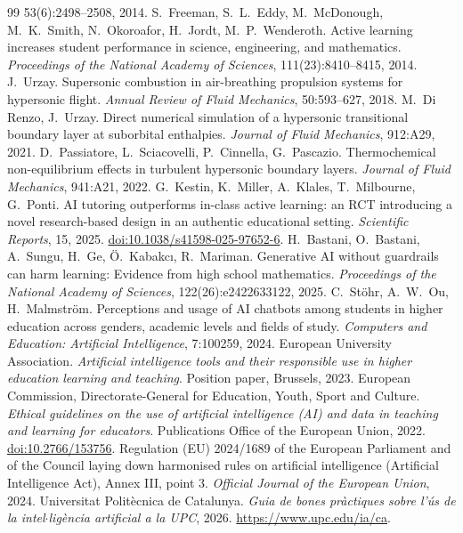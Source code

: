 \documentclass[11pt]{article}
\begin{document}
\begin{thebibliography}{99}
53(6):2498--2508, 2014.
 S.\ Freeman, S.\ L.\ Eddy, M.\ McDonough, M.\ K.\ Smith, N.\ Okoroafor,
H.\ Jordt, M.\ P.\ Wenderoth. Active learning increases student performance in science,
engineering, and mathematics. \emph{Proceedings of the National Academy of Sciences},
111(23):8410--8415, 2014.
 J.\ Urzay. Supersonic combustion in air-breathing propulsion systems for
hypersonic flight. \emph{Annual Review of Fluid Mechanics}, 50:593--627, 2018.
 M.\ Di Renzo, J.\ Urzay. Direct numerical simulation of a
hypersonic transitional boundary layer at suborbital enthalpies. \emph{Journal of Fluid
Mechanics}, 912:A29, 2021.
 D.\ Passiatore, L.\ Sciacovelli, P.\ Cinnella, G.\ Pascazio.
Thermochemical non-equilibrium effects in turbulent hypersonic boundary layers.
\emph{Journal of Fluid Mechanics}, 941:A21, 2022.
 G.\ Kestin, K.\ Miller, A.\ Klales, T.\ Milbourne, G.\ Ponti. AI tutoring
outperforms in-class active learning: an RCT introducing a novel research-based design in an
authentic educational setting. \emph{Scientific Reports}, 15, 2025.
\href{https://doi.org/10.1038/s41598-025-97652-6}{doi:10.1038/s41598-025-97652-6}.
 H.\ Bastani, O.\ Bastani, A.\ Sungu, H.\ Ge, \"O.\ Kabakc\i{}, R.\
Mariman. Generative AI without guardrails can harm learning: Evidence from high school
mathematics. \emph{Proceedings of the National Academy of Sciences}, 122(26):e2422633122,
2025.
 C.\ St\"ohr, A.\ W.\ Ou, H.\ Malmstr\"om. Perceptions and usage of AI
chatbots among students in higher education across genders, academic levels and fields of
study. \emph{Computers and Education: Artificial Intelligence}, 7:100259, 2024.
\bibitem{EUA2023} European University Association. \emph{Artificial intelligence tools and
their responsible use in higher education learning and teaching}. Position paper,
Brussels, 2023.
 European Commission, Directorate-General for Education, Youth, Sport and
Culture. \emph{Ethical guidelines on the use of artificial intelligence (AI) and data in
teaching and learning for educators}. Publications Office of the European Union, 2022.
\href{https://data.europa.eu/doi/10.2766/153756}{doi:10.2766/153756}.
\bibitem{AIAct2024} Regulation (EU) 2024/1689 of the European Parliament and of the Council
laying down harmonised rules on artificial intelligence (Artificial Intelligence Act),
Annex III, point 3. \emph{Official Journal of the European Union}, 2024.
\bibitem{UPCAI2026} Universitat Polit\`ecnica de Catalunya. \emph{Guia de bones pr\`actiques
sobre l'\'us de la intel$\cdot$lig\`encia artificial a la UPC}, 2026.
\url{https://www.upc.edu/ia/ca}.


\end{thebibliography}
\end{document}
